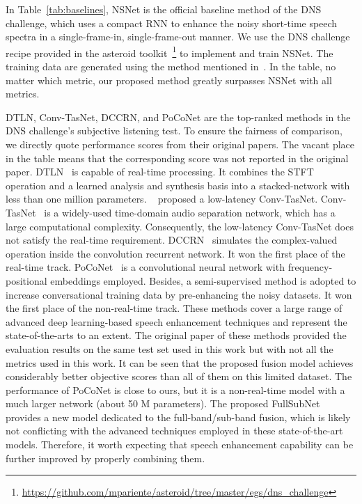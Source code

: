 \documentclass{article}
\begin{document}
In Table~\ref{tab:baselines}, NSNet is the official baseline method of the DNS challenge, which uses a compact RNN to enhance the noisy short-time speech spectra in a single-frame-in, single-frame-out manner. We use the DNS challenge recipe provided in the asteroid toolkit~\footnote{\url{https://github.com/mpariente/asteroid/tree/master/egs/dns_challenge}} to implement and train NSNet. The training data are generated using the method mentioned in~\cite{sub_dns_xiaofeili}.
In the table, no matter which metric, our proposed method greatly surpasses NSNet with all metrics.

DTLN, Conv-TasNet, DCCRN, and PoCoNet are the top-ranked methods in the DNS challenge's subjective listening test. To ensure the fairness of comparison, we directly quote performance scores from their original papers. The vacant place in the table means that the corresponding score was not reported in the original paper.
DTLN~\cite{DTLN} is capable of real-time processing. It combines the STFT operation and a learned analysis and synthesis basis into a stacked-network with less than one million parameters.
~\cite{dns_conv_tasnet} proposed a low-latency Conv-TasNet. Conv-TasNet~\cite{conv_tasnet} is a widely-used time-domain audio separation network, which has a large computational complexity. Consequently, the low-latency Conv-TasNet does not satisfy the real-time requirement.
DCCRN~\cite{DCCRN} simulates the complex-valued operation inside the convolution recurrent network. It won the first place of the real-time track.
PoCoNet~\cite{PoCoNet} is a convolutional neural network with frequency-positional embeddings employed. Besides, a semi-supervised method is adopted to increase conversational training data by pre-enhancing the noisy datasets. It won the first place of the non-real-time track.
These methods cover a large range of advanced deep learning-based speech enhancement techniques and represent the state-of-the-arts to an extent. 
The original paper of these methods provided the evaluation results on the same test set used in this work but with not all the metrics used in this work. 
It can be seen that the proposed fusion model achieves considerably better objective scores than all of them on this limited dataset.
The performance of PoCoNet is close to ours, but it is a non-real-time model with a much larger network (about 50 M parameters).
The proposed FullSubNet provides a new model dedicated to the full-band/sub-band fusion, which is likely not conflicting with the advanced techniques employed in these state-of-the-art models. Therefore, it worth expecting that speech enhancement capability can be further improved by properly combining them.  
\end{document}
